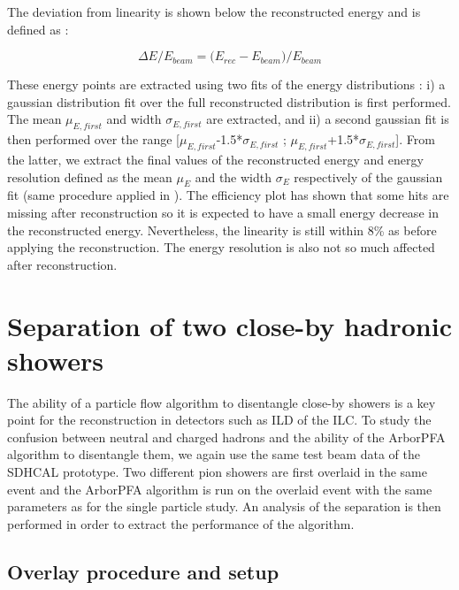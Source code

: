 \documentclass[cits]{JINST}
\begin{document}
The deviation from linearity is shown below the reconstructed energy and is defined as :

\begin{equation}
  \Delta E/E_{beam} = \Big(E_{rec} - E_{beam}\Big)/E_{beam}
\end{equation}

These energy points are extracted using two fits of the energy distributions : i) a gaussian distribution fit over the full reconstructed distribution is first performed. The mean $\mu_{E,first}$ and width $\sigma_{E,first}$ are extracted, and ii) a second gaussian fit is then performed over the range [$\mu_{E,first}$-1.5*$\sigma_{E,first}$ ; $\mu_{E,first}$+1.5*$\sigma_{E,first}$]. From the latter, we extract the final values of the reconstructed energy and energy resolution defined as the mean $\mu_E$ and the width $\sigma_E$ respectively of the gaussian fit (same procedure applied in \cite{sdhcal-paper}). The efficiency plot has shown that some hits are missing after reconstruction so it is expected to have a small energy decrease in the reconstructed energy. Nevertheless, the linearity is still within 8\% as before applying the reconstruction. The energy resolution is also not so much affected after reconstruction.

\newpage
\section{Separation of two close-by hadronic showers}

The ability of a particle flow algorithm to disentangle close-by showers is a key point for the reconstruction in detectors such as ILD of the ILC. To study the confusion between neutral and charged hadrons and the ability of the ArborPFA algorithm to disentangle them, we again use the same test beam data of the SDHCAL prototype. Two different pion showers are first overlaid in the same event and the ArborPFA algorithm is run on the overlaid event with the same parameters as for the single particle study. An analysis of the separation is then performed in order to extract the performance of the algorithm.

\subsection{Overlay procedure and setup}
\end{document}

